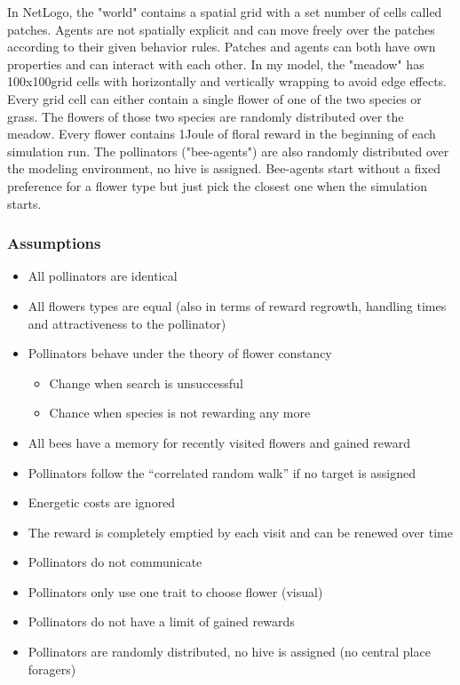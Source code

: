 In NetLogo, the "world" contains a spatial grid with a set number of cells called patches. Agents are not spatially explicit and can move freely over the patches according to their given behavior rules. Patches and agents can both have own properties and can interact with each other. 
In my model, the "meadow" has 100x100grid cells with horizontally and vertically wrapping to avoid edge effects. Every grid cell can either contain a single flower of one of the two species or grass. The flowers of those two species are randomly distributed over the meadow. Every flower contains 1Joule of floral reward in the beginning of each simulation run. The pollinators ("bee-agents") are also randomly distributed over the modeling environment, no hive is assigned. Bee-agents start without a fixed preference for a flower type but just pick the closest one when the simulation starts. 


\subsubsection{Assumptions}

\begin{itemize}
\item	All pollinators are identical
\item All flowers types are equal (also in terms of reward regrowth, handling times and attractiveness to the pollinator)
\item	Pollinators behave under the theory of flower constancy

\begin{itemize}
\item Change when search is unsuccessful
\item Chance when species is not rewarding any more
\end{itemize}

\item	All bees have a memory for recently visited flowers and gained reward
\item	Pollinators follow the “correlated random walk” if no target is assigned
\item	Energetic costs are ignored
\item	The reward is completely emptied by each visit and can be renewed over time
\item	Pollinators do not communicate
\item	Pollinators only use one trait to choose flower (visual)
\item Pollinators do not have a limit of gained rewards
\item	Pollinators are randomly distributed, no hive is assigned  (no central place foragers)

\end{itemize}

